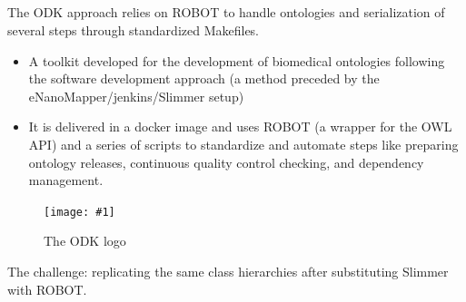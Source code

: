 \documentclass[english, xcolor=dvipsnames, aspectratio=169]{beamer}
\newcommand{\includefiguremedium}[2]
{
    \begin{figure}[h]
    \caption{#2}
    \centering
    \texttt{[image: \#1]}
    \end{figure}
}
\newcommand{\subsectiontitle}{}
\begin{document}
\subsection{\subsectiontitle}
\begin{frame}{\subsectiontitle}
\centering
    The ODK approach relies on ROBOT to handle ontologies and serialization of several steps through standardized Makefiles. \cite{matentzoglu_ontology_2021}
\end{frame}

% 
\begin{frame}{\subsectiontitle}
\begin{itemize}
    \item  A toolkit developed for the development of biomedical ontologies following the software development approach (a method preceded by the eNanoMapper/jenkins/Slimmer setup)
    \item It is delivered in a docker image and uses ROBOT (a wrapper for the OWL API) and a series of scripts to standardize and automate steps like preparing ontology releases, continuous quality control checking, and dependency management. \cite{odk_matentzoglu}
\end{itemize}

    \includefiguremedium{odk-logo_black-banner.png}{The ODK logo}
\end{frame}

\begin{frame}{\subsectiontitle}
The challenge: replicating the same class hierarchies after substituting Slimmer with ROBOT.
\end{frame}

% 
\renewcommand{\subsectiontitle}{Comparison}
\end{document}
